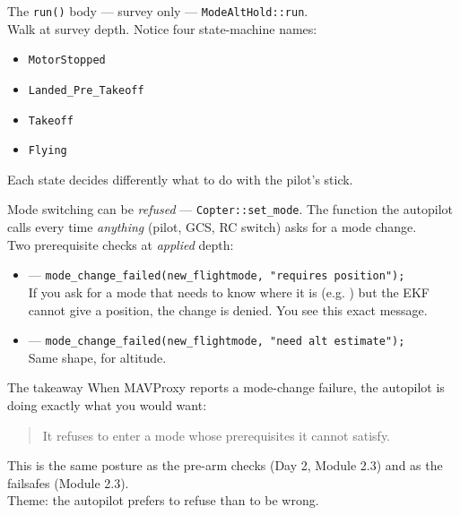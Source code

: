 \documentclass[aspectratio=169,11pt]{beamer}
\begin{document}
\begin{frame}{The \texttt{run()} body --- survey only}
   --- \texttt{ModeAltHold::run}.\\[1ex]
  Walk at survey depth. Notice four state-machine names:
  \begin{itemize}
    \item \texttt{MotorStopped}
    \item \texttt{Landed\_Pre\_Takeoff}
    \item \texttt{Takeoff}
    \item \texttt{Flying}
  \end{itemize}
  Each state decides differently what to do with the pilot's stick.
\end{frame}

\begin{frame}{Mode switching can be \emph{refused}}
   --- \texttt{Copter::set\_mode}. The function the autopilot calls every time \emph{anything} (pilot, GCS, RC switch) asks for a mode change.\\[1ex]
  Two prerequisite checks at \emph{applied} depth:
  \begin{itemize}
    \item {} --- \texttt{mode\_change\_failed(new\_flightmode, "requires position");}\\
      If you ask for a mode that needs to know where it is (e.g. ) but the EKF cannot give a position, the change is denied. You see this exact message.
    \item {} --- \texttt{mode\_change\_failed(new\_flightmode, "need alt estimate");}\\
      Same shape, for altitude.
  \end{itemize}
\end{frame}

\begin{frame}{The takeaway}
  When MAVProxy reports a mode-change failure, the autopilot is doing exactly what you would want:\\[1ex]
  \begin{quote}
    It refuses to enter a mode whose prerequisites it cannot satisfy.
  \end{quote}
  \vfill
  This is the same posture as the pre-arm checks (Day 2, Module 2.3) and as the failsafes (Module 2.3).\\
  Theme: the autopilot prefers to refuse than to be wrong.
\end{frame}
\end{document}

